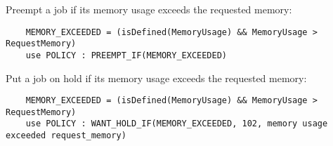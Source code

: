 Preempt a job if its memory usage exceeds the requested memory:
    \begin{verbatim}
	MEMORY_EXCEEDED = (isDefined(MemoryUsage) && MemoryUsage > RequestMemory)
	use POLICY : PREEMPT_IF(MEMORY_EXCEEDED)
    \end{verbatim}

Put a job on hold if its memory usage exceeds the requested memory:
    \begin{verbatim}
	MEMORY_EXCEEDED = (isDefined(MemoryUsage) && MemoryUsage > RequestMemory)
	use POLICY : WANT_HOLD_IF(MEMORY_EXCEEDED, 102, memory usage exceeded request_memory)
    \end{verbatim}
